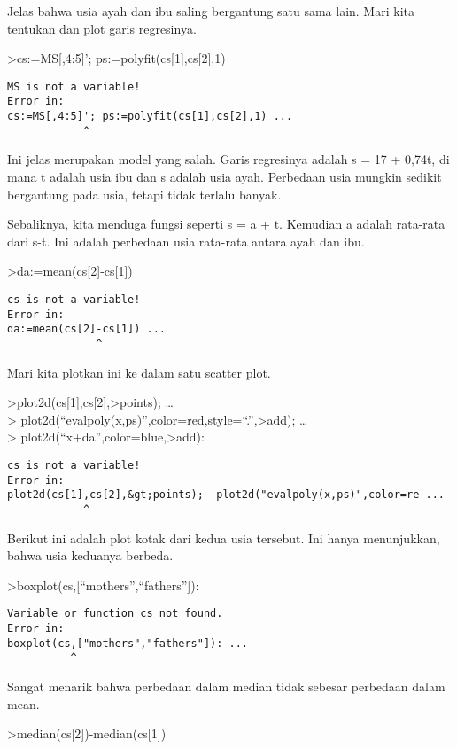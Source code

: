 \documentclass[
]{book}
\begin{document}
Jelas bahwa usia ayah dan ibu saling bergantung satu sama lain. Mari kita tentukan dan plot garis regresinya.

\textgreater cs:=MS{[},4:5{]}'; ps:=polyfit(cs{[}1{]},cs{[}2{]},1)

\begin{verbatim}
MS is not a variable!
Error in:
cs:=MS[,4:5]'; ps:=polyfit(cs[1],cs[2],1) ...
            ^
\end{verbatim}

Ini jelas merupakan model yang salah. Garis regresinya adalah s = 17 + 0,74t, di mana t adalah usia ibu dan s adalah usia ayah. Perbedaan usia mungkin sedikit bergantung pada usia, tetapi tidak terlalu banyak.

Sebaliknya, kita menduga fungsi seperti s = a + t. Kemudian a adalah rata-rata dari s-t. Ini adalah perbedaan usia rata-rata antara ayah dan ibu.

\textgreater da:=mean(cs{[}2{]}-cs{[}1{]})

\begin{verbatim}
cs is not a variable!
Error in:
da:=mean(cs[2]-cs[1]) ...
              ^
\end{verbatim}

Mari kita plotkan ini ke dalam satu scatter plot.

\textgreater plot2d(cs{[}1{]},cs{[}2{]},\textgreater points); \ldots{}\\
\textgreater{} plot2d(``evalpoly(x,ps)'',color=red,style=``.'',\textgreater add); \ldots{}\\
\textgreater{} plot2d(``x+da'',color=blue,\textgreater add):

\begin{verbatim}
cs is not a variable!
Error in:
plot2d(cs[1],cs[2],&gt;points);  plot2d("evalpoly(x,ps)",color=re ...
            ^
\end{verbatim}

Berikut ini adalah plot kotak dari kedua usia tersebut. Ini hanya menunjukkan, bahwa usia keduanya berbeda.

\textgreater boxplot(cs,{[}``mothers'',``fathers''{]}):

\begin{verbatim}
Variable or function cs not found.
Error in:
boxplot(cs,["mothers","fathers"]): ...
          ^
\end{verbatim}

Sangat menarik bahwa perbedaan dalam median tidak sebesar perbedaan dalam mean.

\textgreater median(cs{[}2{]})-median(cs{[}1{]})
\end{document}
